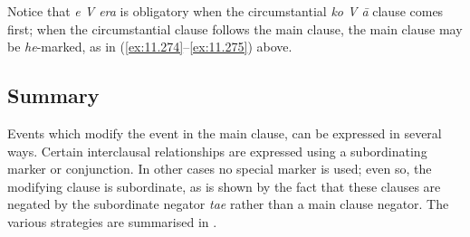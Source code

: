 Notice that \textit{e V era} is obligatory when the circumstantial \textit{ko V {\ꞌ}ā} clause comes first; when the circumstantial clause follows the main clause, the main clause may be \textit{he}{}-marked, as in (\ref{ex:11.274}–\ref{ex:11.275}) above.

\subsection{Summary}\label{sec:11.6.9}

Events which modify the event in the main clause, can be expressed in several ways. Certain interclausal relationships are expressed using a subordinating marker or conjunction. In other cases no special marker is used; even so, the modifying clause is subordinate, as is shown by the fact that these clauses are negated by the subordinate negator \textit{ta{\ꞌ}e} rather than a main clause negator. The various strategies are summarised in .

